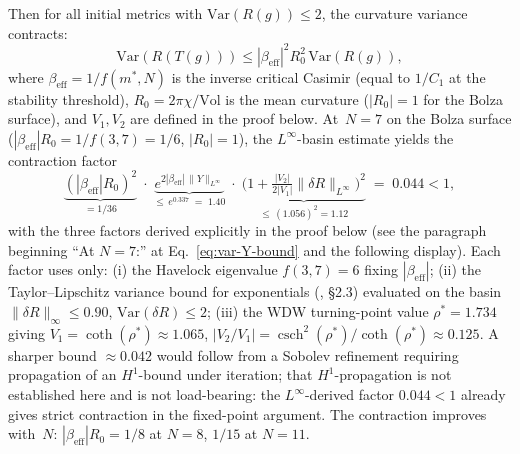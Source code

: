 \begin{corollary}
Then for all initial metrics with
$\mathrm{Var}(R(g)) \le 2$,
the curvature variance contracts:
\begin{equation}\label{eq:onsager-contraction}
  \mathrm{Var}(R(T(g)))
  \le |\beta_{\mathrm{eff}}|^2 R_0^2\,\mathrm{Var}(R(g)),
\end{equation}
where $\beta_{\mathrm{eff}} = 1/f(m^*,N)$ is the inverse
critical Casimir (equal to $1/C_1$ at the stability threshold),
$R_0 = 2\pi\chi/\mathrm{Vol}$ is the mean curvature
($|R_0| = 1$ for the Bolza surface), and
$V_1, V_2$ are defined in the proof below.
At~$N = 7$ on the Bolza surface
($|\beta_{\mathrm{eff}}| R_0 = 1/f(3,7) = 1/6$, $|R_0| = 1$),
the $L^\infty$-basin estimate yields the contraction factor
\begin{equation}\label{eq:044-decomposition}
  \underbrace{(|\beta_{\mathrm{eff}}| R_0)^2}_{= 1/36}
  \;\cdot\;
  \underbrace{e^{2|\beta_{\mathrm{eff}}|\,\|Y\|_{L^\infty}}}_{\le\, e^{0.337}
    \;=\; 1.40}
  \;\cdot\;
  \underbrace{\bigl(1 + \tfrac{|V_2|}{2|V_1|}\|\delta R\|_{L^\infty}\bigr)^2}_{\le\, (1.056)^2 = 1.12}
  \;=\; 0.044 < 1,
\end{equation}
with the three factors derived explicitly in the proof
below (see the paragraph beginning ``At $N = 7$:'' at
Eq.~\eqref{eq:var-Y-bound} and the following display).
Each factor uses only: (i) the Havelock eigenvalue
$f(3,7) = 6$ fixing $|\beta_{\mathrm{eff}}|$; (ii) the
Taylor--Lipschitz variance bound for exponentials
(\citealt{BoucheronLugosiMassart2013}, \S2.3) evaluated
on the basin $\|\delta R\|_\infty \le 0.90$,
$\mathrm{Var}(\delta R) \le 2$; (iii) the
WDW turning-point value $\rho^* = 1.734$ giving
$V_1 = \coth(\rho^*) \approx 1.065$,
$|V_2/V_1| = \operatorname{csch}^2(\rho^*)/\coth(\rho^*)
\approx 0.125$.
A sharper bound $\approx 0.042$ would follow from a Sobolev
refinement requiring propagation of an $H^1$-bound under
iteration; that $H^1$-propagation is not established here and
is not load-bearing: the $L^\infty$-derived factor
$0.044 < 1$ already gives strict contraction in the
fixed-point argument.
The contraction improves with~$N$: $|\beta_{\mathrm{eff}}| R_0
= 1/8$ at $N = 8$, $1/15$ at $N = 11$.
\end{corollary}

